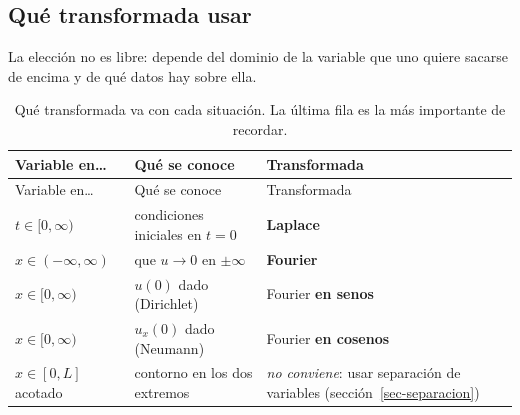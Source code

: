 \documentclass[
  spanish,
  a4paper,
]{scrbook}
\theoremstyle{definition}
\theoremstyle{plain}
\theoremstyle{definition}
\theoremstyle{plain}
\theoremstyle{definition}
\theoremstyle{remark}
\begin{document}
\subsection{Qué transformada usar}\label{sec-que-transformada}

La elección no es libre: depende del dominio de la variable que uno
quiere sacarse de encima y de qué datos hay sobre ella.

\begin{longtable}[]{@{}
  >{\raggedright\arraybackslash}p{}
  >{\raggedright\arraybackslash}p{}
  >{\raggedright\arraybackslash}p{}@{}}
\caption{Qué transformada va con cada situación. La última fila es la
más importante de recordar.}\label{tbl-transformadas}\tabularnewline
\toprule\noalign{}
\begin{minipage}[b]{\linewidth}\raggedright
Variable en\ldots{}
\end{minipage} & \begin{minipage}[b]{\linewidth}\raggedright
Qué se conoce
\end{minipage} & \begin{minipage}[b]{\linewidth}\raggedright
Transformada
\end{minipage} \\
\midrule\noalign{}
\endfirsthead
\toprule\noalign{}
\begin{minipage}[b]{\linewidth}\raggedright
Variable en\ldots{}
\end{minipage} & \begin{minipage}[b]{\linewidth}\raggedright
Qué se conoce
\end{minipage} & \begin{minipage}[b]{\linewidth}\raggedright
Transformada
\end{minipage} \\
\midrule\noalign{}
\endhead
\bottomrule\noalign{}
\endlastfoot
\(t \in [0,\infty)\) & condiciones iniciales en \(t=0\) &
\textbf{Laplace} \\
\(x \in (-\infty,\infty)\) & que \(u\to 0\) en \(\pm\infty\) &
\textbf{Fourier} \\
\(x \in [0,\infty)\) & \(u(0)\) dado (Dirichlet) & Fourier \textbf{en
senos} \\
\(x \in [0,\infty)\) & \(u_x(0)\) dado (Neumann) & Fourier \textbf{en
cosenos} \\
\(x \in [0,L]\) acotado & contorno en los dos extremos & \emph{no
conviene}: usar separación de variables
(sección~\ref{sec-separacion}) \\
\end{longtable}
\end{document}
